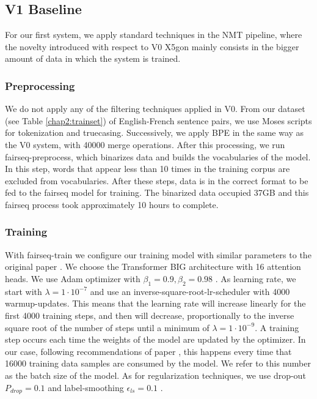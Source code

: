 \documentclass[11pt,english,listoffigures,listoftables]{tfgetsinf}
\begin{document}
\subsection{V1 Baseline}\label{V1}
For our first system, we apply standard techniques in the NMT pipeline, where the novelty introduced with respect to V0 X5gon mainly consists in the bigger amount of data in which the system is trained.
\subsubsection{Preprocessing}
 We do not apply any of the filtering techniques applied in V0. From our dataset (see Table \ref{chap2:trainset}) of English-French sentence pairs, we use Moses scripts for tokenization and truecasing.
Successively, we apply BPE in the same way as the V0 system, with 40000 merge operations. After this processing, we run fairseq-preprocess, which binarizes data and builds the vocabularies of the model.
In this step, words that appear less than 10 times in the training corpus are excluded from vocabularies. 
After these steps, data is in the correct format to be fed to the fairseq model for training. The binarized data occupied 37GB and this fairseq process took approximately 10 hours to complete.    


\subsubsection{Training}
With fairseq-train we configure our training model with similar parameters to the original paper \cite{https://doi.org/10.48550/arxiv.1706.03762}. We choose the Transformer BIG architecture with 16 attention heads. We use Adam optimizer with $\beta_1=0.9, \beta_2=0.98$ \cite{https://doi.org/10.48550/arxiv.1412.6980}.
As learning rate, we start with $\lambda=1\cdot10^{-7}$ and use an inverse-square-root-lr-scheduler with 4000 warmup-updates. This means that the learning rate will increase linearly for the first 4000 training steps, and then will decrease, proportionally to the inverse square root of the number of steps until a minimum of $\lambda=1\cdot10^{-9}$. A training step occurs each time the weights of the model are updated by the optimizer. In our case, following recommendations of paper \cite{https://doi.org/10.48550/arxiv.1706.03762}, this happens every time that 16000 training data samples are consumed by the model. We refer to this number as the batch size of the model.
As for regularization techniques, we use drop-out $P_{drop}=0.1$ \cite{JMLR:v15:srivastava14a} and label-smoothing $\epsilon_{ls}=0.1$ \cite{DBLP:journals/corr/SzegedyVISW15}. 
\end{document}
